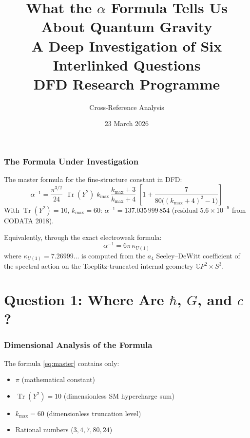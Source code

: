 \documentclass[12pt,a4paper]{article}
\title{What the $\alpha$ Formula Tells Us About Quantum Gravity\\[6pt]
\large A Deep Investigation of Six Interlinked Questions\\[6pt]
\normalsize DFD Research Programme}
\author{Cross-Reference Analysis}
\date{23 March 2026}
\newcommand{\Tr}{\operatorname{Tr}}
\newcommand{\CP}{\mathbb{C}P}
\begin{document}
\maketitle
\tableofcontents
\newpage

\section{The Formula Under Investigation}
\label{sec:formula}

The master formula for the fine-structure constant in DFD:
\begin{equation}
\boxed{\alpha^{-1} = \frac{\pi^{3/2}}{24}\;\Tr(Y^2)\;k_{\max}\,\frac{k_{\max}+3}{k_{\max}+4}\;\left[1 + \frac{7}{80\bigl((k_{\max}+4)^2-1\bigr)}\right]}
\label{eq:master}
\end{equation}
With $\Tr(Y^2) = 10$, $k_{\max} = 60$: $\alpha^{-1} = 137.035\,999\,854$ (residual $5.6 \times 10^{-9}$ from CODATA 2018).

Equivalently, through the exact electroweak formula:
\begin{equation}
\alpha^{-1} = 6\pi\,\kappa_{U(1)}
\label{eq:ew}
\end{equation}
where $\kappa_{U(1)} = 7.26999\ldots$ is computed from the $a_4$ Seeley--DeWitt coefficient of the spectral action on the Toeplitz-truncated internal geometry $\CP^2 \times S^3$.


\part{Question 1: Where Are $\hbar$, $G$, and $c$?}
\label{part:q1}

\section{Dimensional Analysis of the Formula}

The formula \eqref{eq:master} contains only:
\begin{itemize}
\item $\pi$ (mathematical constant)
\item $\Tr(Y^2) = 10$ (dimensionless SM hypercharge sum)
\item $k_{\max} = 60$ (dimensionless truncation level)
\item Rational numbers ($3, 4, 7, 80, 24$)
\end{itemize}
\end{document}
